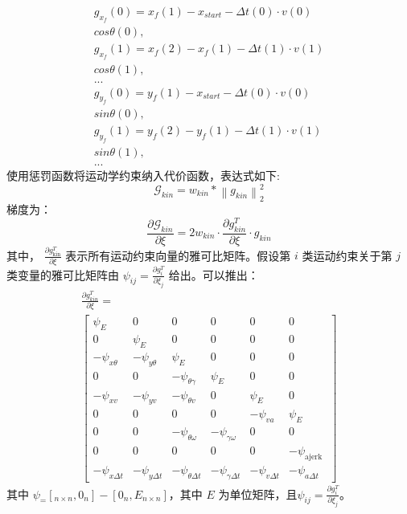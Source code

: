 \documentclass[master,academic]{ysuthesis} %
\begin{document}
		\begin{equation}
			\begin{aligned}
				g_{x_f}( 0 ) =x_f( 1 ) -x_{start}-\Delta t( 0 ) \cdot v( 0 ) \\cos \theta( 0 ) ,\\
				g_{x_f}( 1 ) =x_f( 2 ) -x_f( 1 ) -\Delta t( 1 ) \cdot v( 1 ) \\cos \theta ( 1 ) ,\\
				...\\
				g_{y_f}( 0 ) =y_f( 1 ) -x_{start}-\Delta t( 0 ) \cdot v( 0 ) \\sin \theta ( 0 ) ,\\
				g_{y_f}( 1 ) =y_f( 2 ) -y_f( 1 ) -\Delta t( 1 ) \cdot v( 1 ) \\sin \theta ( 1 ) ,\\
				...
			\end{aligned}   
		\end{equation}
		使用惩罚函数将运动学约束纳入代价函数，表达式如下:
		\begin{equation}
			\mathcal{G}_{kin} = w_{kin}*\left \| g_{kin} \right \|_2^2 \label{Gkin}
		\end{equation}
		梯度为：
		\begin{equation}
			\frac{\partial\mathcal{G}_{kin}}{\partial\xi}=2w_{kin}\cdot\frac{\partial g_{kin}^T}{\partial\xi}\cdot g_{kin}\label{18}
		\end{equation}
		其中， \(\frac{\partial g_{\text{kin}}^T}{\partial \xi}\) 表示所有运动约束向量的雅可比矩阵。假设第 \(i\) 类运动约束关于第 \(j\) 类变量的雅可比矩阵由 \(\psi_{ij} = \frac{\partial g^T_{i}}{\partial \xi_j}\) 给出。可以推出：
		\begin{equation}
			\begin{array}{c}
				\frac{\partial g_{k i n}^{T}}{\partial \xi}= \\
				{\left[\begin{array}{cccccc}
						\psi_{E} & 0 & 0 & 0 & 0 & 0 \\
						0 & \psi_{E} & 0 & 0 & 0 & 0 \\
						-\psi_{x \theta} & -\psi_{y \theta} & \psi_{E} & 0 & 0 & 0 \\
						0 & 0 & -\psi_{\theta \gamma} & \psi_{E} & 0 & 0 \\
						-\psi_{x v} & -\psi_{y v} & -\psi_{\theta v} & 0 & \psi_{E} & 0 \\
						0 & 0 & 0 & 0 & -\psi_{v a} & \psi_{E} \\
						0 & 0 & -\psi_{\theta \omega} & -\psi_{\gamma \omega} & 0 & 0 \\
						0 & 0 & 0 & 0 & 0 & -\psi_{\text {ajerk }} \\
						-\psi_{x \Delta t} & -\psi_{y \Delta t} & -\psi_{\theta \Delta t} & -\psi_{\gamma \Delta t} & -\psi_{v \Delta t} & -\psi_{a \Delta t}
					\end{array}\right]}
			\end{array}
			\label{eq:运动学约束的雅可比}
		\end{equation}
		其中 $\psi _ = [_{n \times n}, 0_n] - [0_n, E_{n \times n}]$，其中 $E$ 为单位矩阵，且\(\psi_{ij} = \frac{\partial g^T_{i}}{\partial \xi_j}\)。
\end{document}
